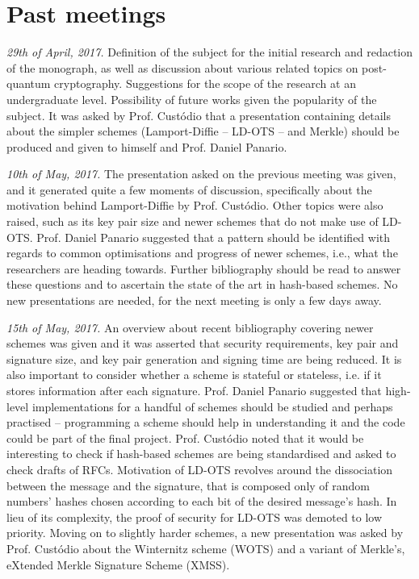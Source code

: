 \documentclass{article}
\begin{document}
\newcommand{\rfc}{Prof. Custódio}
\newcommand{\dan}{Prof. Daniel Panario}
\newcommand{\hh}{$\mathcal{H}$}
\newcommand{\hash}[2][]{\mathcal{H}^{#1}(#2)}

\section*{Past meetings}

\emph{29th of April, 2017.} Definition of the subject for the initial research
and redaction of the monograph, as well as discussion about various related
topics on post-quantum cryptography. Suggestions for the scope of the research
at an undergraduate level. Possibility of future works given the popularity of
the subject. It was asked by \rfc{} that a presentation containing details
about the simpler schemes (Lamport-Diffie -- LD-OTS -- and Merkle) should be
produced and given to himself and \dan{}.

\emph{10th of May, 2017.} The presentation asked on the previous meeting was
given, and it generated quite a few moments of discussion, specifically about
the motivation behind Lamport-Diffie by \rfc{}. Other topics were also raised,
such as its key pair size and newer schemes that do not make use of LD-OTS.
\dan{} suggested that a pattern should be identified with regards to common
optimisations and progress of newer schemes, i.e., what the researchers are
heading towards. Further bibliography should be read to answer these questions
and to ascertain the state of the art in hash-based schemes. No new
presentations are needed, for the next meeting is only a few days away.

\emph{15th of May, 2017.} An overview about recent bibliography covering newer
schemes was given and it was asserted that security requirements, key pair and
signature size, and key pair generation and signing time are being reduced. It
is also important to consider whether a scheme is stateful or stateless, i.e.
if it stores information after each signature. \dan{} suggested that high-level
implementations for a handful of schemes should be studied and perhaps
practised -- programming a scheme should help in understanding it and the code
could be part of the final project. \rfc{} noted that it would be interesting
to check if hash-based schemes are being standardised and asked to check drafts
of RFCs.  Motivation of LD-OTS revolves around the dissociation between the
message and the signature, that is composed only of random numbers' hashes
chosen according to each bit of the desired message's hash. In lieu of its
complexity, the proof of security for LD-OTS was demoted to low priority.
Moving on to slightly harder schemes, a new presentation was asked by \rfc{}
about the Winternitz scheme (WOTS) and a variant of Merkle's, eXtended Merkle
Signature Scheme (XMSS).
\end{document}

